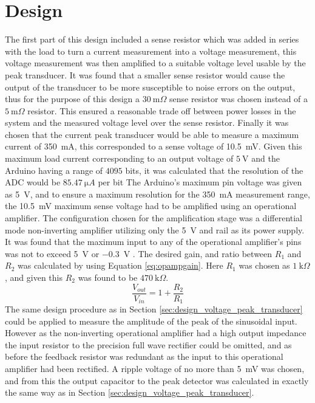 \section{Design} \label{sec:design_current_peak_transducer}
The first part of this design included a sense resistor which was added in series with the load to turn a current measurement into a voltage measurement, this voltage measurement was then amplified to a suitable voltage level usable by the peak transducer. It was found that a smaller sense resistor would cause the output of the transducer to be more susceptible to noise errors on the output, thus for the purpose of this design a $\SI{30}{\milli \Omega}$ sense resistor was chosen instead of a $\SI{5}{\milli \Omega}$ resistor. This ensured a reasonable trade off between power losses in the system and the measured voltage level over the sense resistor. Finally it was chosen that the current peak transducer would be able to measure a maximum current of \SI{350}{\milli A}, this corresponded to a sense voltage of \SI{10.5}{\milli V}. Given this maximum load current corresponding to an output voltage of $\SI{5}{\volt}$ and the Arduino having a range of $4095$ bits, it was calculated that the resolution of the ADC would be $\SI{85.47}{\micro A}$ per bit\vspace{4mm} \newline
The Arduino's maximum pin voltage was given as \SI{5}{\volt}, and to ensure a maximum resolution for the \SI{350}{\milli A} measurement range, the \SI{10.5}{\milli V} maximum sense voltage had to be amplified using an operational amplifier. The configuration chosen for the amplification stage was a differential mode non-inverting amplifier utilizing only the \SI{5}{\volt} and rail as its power supply. It was found that the maximum input to any of the operational amplifier's pins was not to exceed \SI{5}{\volt} or \SI{-0.3}{\volt} \cite{TLC2272:2016}.
The desired gain, and ratio between $R_1$ and $R_2$ was calculated by using Equation \ref{eq:opampgain}. Here $R_1$ was chosen as $\SI{1}{\kilo \Omega}$, and given this $R_2$ was found to be $\SI{470}{\kilo \Omega}$.\newline
\begin{equation}
   \frac{V_{out}}{V_{in}}=1+\frac{R_2}{R_1} 
   \label{eq:opampgain}
\end{equation}
The same design procedure as in Section \ref{sec:design_voltage_peak_transducer} could be applied to measure the amplitude of the peak of the sinusoidal input. However as the non-inverting operational amplifier had a high output impedance the input resistor to the precision full wave rectifier could be omitted, and as before the feedback resistor was redundant as the input to this operational amplifier had been rectified. A ripple voltage of no more than \SI{5}{\milli \volt} was chosen, and from this the output capacitor to the peak detector was calculated in exactly the same way as in Section \ref{sec:design_voltage_peak_transducer}. \vspace{4mm} \newline
